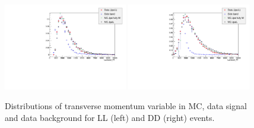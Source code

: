 \begin{figure}[h!]
\centering
\includegraphics[width=0.48\textwidth]{Lmumu/figs/MC_data_comp/Lambda0_PT_plotLL.pdf}
\includegraphics[width=0.48\textwidth]{Lmumu/figs/MC_data_comp/Lambda0_PT_plotDD.pdf}
\caption{ Distributions of \Lz transverse momentum variable in MC, data signal and data background for LL (left) and DD (right) events.   }
\end{figure}










